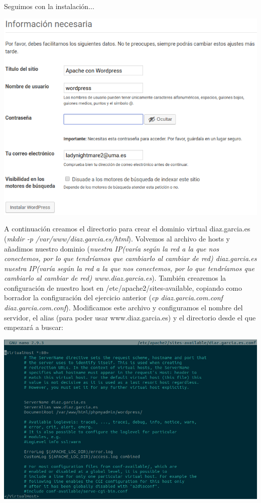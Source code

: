 \documentclass{article}
\begin{document}
Seguimos con la instalación...

\begin{flushleft}
\includegraphics[scale=0.5]{wordpress.png}
\end{flushleft}

A continuación creamos el directorio para crear el dominio virtual diaz.garcia.es (\textit{mkdir -­p /var/www/diaz.garcia.es/html}). Volvemos al archivo de hosts y añadimos nuestro dominio (\textit{nuestra IP(varía según la red a la que nos conectemos, por lo que tendríamos que cambiarlo al cambiar de red) diaz.garcia.es\\nuestra IP(varía según la red a la que nos conectemos, por lo que tendríamos que cambiarlo al cambiar de red) www.diaz.garcia.es}). También crearemos la configuración de nuestro host en /etc/apache2/sites-available, copiando como borrador la configuración del ejercicio anterior (\textit{cp diaz.garcia.com.conf diaz.garcia.com.conf}). Modificamos este archivo y configuramos el nombre del servidor, el alias (para poder usar www.diaz.garcia.es) y el directorio desde el que empezará a buscar:

\begin{flushleft}
\includegraphics[scale=0.37]{conf2.png}
\end{flushleft}
\end{document}
